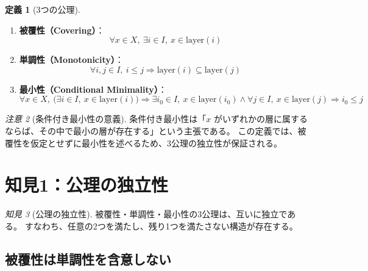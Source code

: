\documentclass[a4paper,11pt]{ltjsarticle}
\theoremstyle{definition}
\newtheorem{definition}{定義}[section]
\theoremstyle{plain}
\theoremstyle{remark}
\newtheorem{remark}[definition]{注意}
\newtheorem{insight}[definition]{知見}
\newcommand{\Layer}{\mathrm{layer}}
\begin{document}
\begin{definition}[3つの公理]\label{def:axioms}
\begin{enumerate}
    \item \textbf{被覆性（Covering）}：
    \[
        \forall x \in X,\ \exists i \in I,\ x \in \Layer(i)
    \]
    
    \item \textbf{単調性（Monotonicity）}：
    \[
        \forall i, j \in I,\ i \leq j \Rightarrow \Layer(i) \subseteq \Layer(j)
    \]
    
    \item \textbf{最小性（Conditional Minimality）}：
    \[
        \forall x \in X,\ \bigl(\exists i \in I,\ x \in \Layer(i)\bigr) \Rightarrow
        \exists i_0 \in I,\ x \in \Layer(i_0) \land \forall j \in I,\ x \in \Layer(j) \Rightarrow i_0 \leq j
    \]
\end{enumerate}
\end{definition}

\begin{remark}[条件付き最小性の意義]
条件付き最小性は「$x$ がいずれかの層に属するならば、その中で最小の層が存在する」という主張である。
この定義では、被覆性を仮定とせずに最小性を述べるため、3公理の独立性が保証される。
\end{remark}

\section{知見1：公理の独立性}

\begin{insight}[公理の独立性]
被覆性・単調性・最小性の3公理は、互いに独立である。
すなわち、任意の2つを満たし、残り1つを満たさない構造が存在する。
\end{insight}

\subsection{被覆性は単調性を含意しない}
\end{document}
